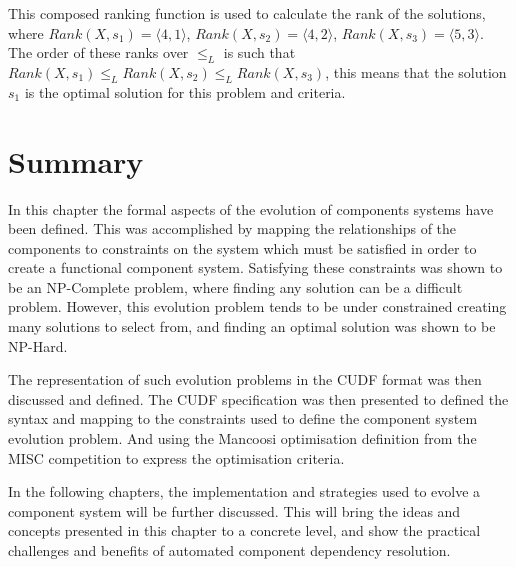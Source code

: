 This composed ranking function is used to calculate the rank of the solutions, where $Rank(X,s_1) = \langle 4, 1\rangle$, $Rank(X,s_2) = \langle 4, 2\rangle$, $Rank(X,s_3) = \langle 5, 3\rangle$.
The order of these ranks over $\leq_L$ is such that $Rank(X,s_1) \leq_L Rank(X,s_2) \leq_L Rank(X,s_3)$,
this means that the solution $s_1$ is the optimal solution for this problem and criteria.  


\section{Summary}
In this chapter the formal aspects of the evolution of components systems have been defined.
This was accomplished by mapping the relationships of the components to constraints on the system which must be satisfied in order to create a functional component system.
Satisfying these constraints was shown to be an NP-Complete problem, where finding any solution can be a difficult problem.
However, this evolution problem tends to be under constrained creating many solutions to select from, and finding an optimal solution was shown to be NP-Hard.

The representation of such evolution problems in the CUDF format was then discussed and defined.
The CUDF specification was then presented to defined the syntax and mapping to the constraints used to define the component system evolution problem.
And using the Mancoosi optimisation definition from the MISC competition to express the optimisation criteria.

In the following chapters, the implementation and strategies used to evolve a component system will be further discussed.
This will bring the ideas and concepts presented in this chapter to a concrete level, and show the practical challenges and benefits of automated component dependency resolution. 